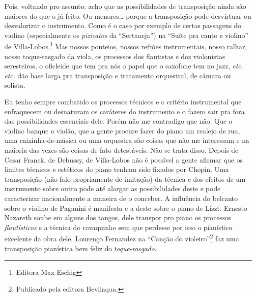 Pois, voltando pro assunto: acho que as possibilidades de transposição
ainda são maiores do que o já feito. Ou menores\ldots{} porque a transposição
pode desvirtuar ou desvalorizar o instrumento. Como é o caso por exemplo
de certas passagens do violino (especialmente os \textit{pizicatos} da
``Sertaneja'') na ``Suíte pra canto e violino'' de Villa-Lobos.\footnote{Editora Max
Eschig} Mas nossos ponteios, nossos refrões instrumentais, nosso
ralhar, nosso toque-rasgado da viola, os processos dos flautistas e dos
violonistas seresteiros, o oficleide que tem pra nós o papel que o
saxofone tem no jazz, \textit{etc. etc.} dão base larga pra transposição e
tratamento orquestral, de câmara ou solista.

Eu tenho sempre combatido os processos técnicos e o critério
instrumental que enfraquecem ou desnaturam os caráteres do instrumento e
o fazem sair pra fora das possibilidades essenciais dele. Porém não me
contradigo que não. Que o violino banque o violão, que a gente procure
fazer do piano um realejo de rua, uma caixinha-de-música ou uma
orquestra são coisas que não me interessam e na maioria das vezes são
coisas de fato detestáveis. Não se trata disso. Depois de Cesar Franck,
de Debussy, de Villa-Lobos não é possível a gente afirmar que os limites
técnicos e estéticos do piano tenham sido fixados por Chopin. Uma
transposição (não falo propriamente de imitação) da técnica e dos
efeitos de um instrumento sobre outro pode até alargar as possibilidades
deste e pode caracterizar nacionalmente a maneira de o conceber. A
influência do belcanto sobre o violino de Paganini é manifesta e a deste
sobre o piano de Liszt. Ernesto Nazareth soube em alguns dos tangos,
dele transpor pro piano os processos \textit{flautísticos} e a técnica do
cavaquinho sem que perdesse por isso o pianístico excelente da obra
dele. Lourenço Fernandez na ``Canção do violeiro''\footnote{Publicado pela editora Bevilaqua.} faz uma
transposição pianística bem feliz do \textit{toque-rasgado}.

